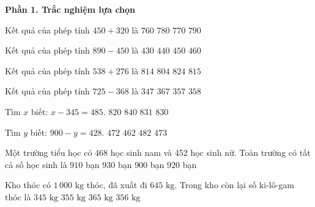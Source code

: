 \textbf{Phần 1. Trắc nghiệm lựa chọn}

\begin{ex} %
Kết quả của phép tính $450 + 320$ là
\choice
{$760$}
{$780$}
{\True $770$}
{$790$}
\end{ex}

\begin{ex} %
Kết quả của phép tính $890 - 450$ là
\choice
{$430$}
{\True $440$}
{$450$}
{$460$}
\end{ex}

\begin{ex} %
Kết quả của phép tính $538 + 276$ là
\choice
{\True $814$}
{$804$}
{$824$}
{$815$}
\end{ex}

\begin{ex} %
Kết quả của phép tính $725 - 368$ là
\choice
{$347$}
{$367$}
{\True $357$}
{$358$}
\end{ex}

\begin{ex} %
Tìm $x$ biết: $x - 345 = 485$.
\choice
{$820$}
{$840$}
{$831$}
{\True $830$}
\end{ex}

\begin{ex} %
Tìm $y$ biết: $900 - y = 428$.
\choice
{\True $472$}
{$462$}
{$482$}
{$473$}
\end{ex}

\begin{ex} %
Một trường tiểu học có 468 học sinh nam và 452 học sinh nữ. Toàn trường có tất cả số học sinh là
\choice
{$910$ bạn}
{$930$ bạn}
{$900$ bạn}
{\True $920$ bạn}
\end{ex}

\begin{ex} %
Kho thóc có $1\,000\text{ kg}$ thóc, đã xuất đi $645\text{ kg}$. Trong kho còn lại số ki-lô-gam thóc là
\choice
{$345\text{ kg}$}
{\True $355\text{ kg}$}
{$365\text{ kg}$}
{$356\text{ kg}$}
\end{ex}

